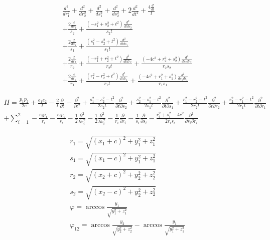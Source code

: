 \documentclass{article}
\begin{document}
\begin{align*}
  \frac{d^{2}}{d r_{1}^{2}}  + \frac{d^{2}}{d r_{2}^{2}}  + \frac{d^{2}}{d s_{1}^{2}}  + \frac{d^{2}}{d s_{2}^{2}} + 2 \frac{d^{2}}{d t^{2}}  + \frac{4 \frac{d}{d t} }{t}\\
  + \frac{2 \frac{d}{d s_{2}} }{s_{2}} + \frac{\left(- s_{1}^{2} + s_{2}^{2} + t^{2}\right) \frac{d^{2}}{d td s_{2}} }{s_{2} t}\\
  + \frac{2 \frac{d}{d s_{1}} }{s_{1}} + \frac{\left(s_{1}^{2} - s_{2}^{2} + t^{2}\right) \frac{d^{2}}{d td s_{1}} }{s_{1} t}\\
  + \frac{2 \frac{d}{d r_{2}} }{r_{2}} + \frac{\left(- r_{1}^{2} + r_{2}^{2} + t^{2}\right) \frac{d^{2}}{d td r_{2}} }{r_{2} t} + \frac{\left(- 4 c^{2} + r_{2}^{2} + s_{2}^{2}\right) \frac{d^{2}}{d s_{2}d r_{2}} }{r_{2} s_{2}}\\
  + \frac{2 \frac{d}{d r_{1}} }{r_{1}} + \frac{\left(r_{1}^{2} - r_{2}^{2} + t^{2}\right) \frac{d^{2}}{d td r_{1}} }{r_{1} t} + \frac{\left(- 4 c^{2} + r_{1}^{2} + s_{1}^{2}\right) \frac{d^{2}}{d s_{1}d r_{1}} }{r_{1} s_{1}}
\end{align*}

\begin{align*}
  H=\frac{p_1p_2}{2c} + \frac{e_1e_2}{t} -\frac{2}{t}\frac{\partial}{\partial t} - \frac{\partial^2}{\partial t^2} + \frac{s_1^2-s_2^2-t^2}{2s_2t}\frac{\partial^2}{\partial t\partial s_2} + \frac{s_2^2-s_1^2-t^2}{2s_1t}\frac{\partial^2}{\partial t\partial s_1}  + \frac{r_1^2-r_2^2-t^2}{2r_2t}\frac{\partial^2}{\partial t\partial r_2} + \frac{r_2^2-r_1^2-t^2}{2r_1t}\frac{\partial^2}{\partial t\partial r_1} \\
  + \sum_{i=1}^2 -\frac{e_ip_1}{r_i} -\frac{e_ip_2}{s_i} - \frac{1}{2}\frac{\partial^2}{\partial r_i^2}- \frac{1}{2}\frac{\partial^2}{\partial s_i^2} - \frac{1}{r_i}\frac{\partial}{\partial r_i} - \frac{1}{s_i}\frac{\partial}{\partial s_i} - \frac{r_i^2+s_i^2-4c^2}{2r_is_i}\frac{\partial^2}{\partial s_i\partial r_i}
\end{align*}

\begin{align*}
  r_1=\sqrt{(x_1+c)^2+y_1^2+z_1^2}\\
  s_1=\sqrt{(x_1-c)^2+y_1^2+z_1^2}\\
  r_2=\sqrt{(x_2+c)^2+y_2^2+z_2^2}\\
  s_2=\sqrt{(x_2-c)^2+y_2^2+z_2^2}\\
  \varphi=\arccos{\frac{y_1}{\sqrt{y_1^2+z_1^2}}}\\
  \varphi_{12}=\arccos{\frac{y_2}{\sqrt{y_2^2+z_2^2}}} - \arccos{\frac{y_1}{\sqrt{y_1^2+z_1^2}}}
\end{align*}
\end{document}
